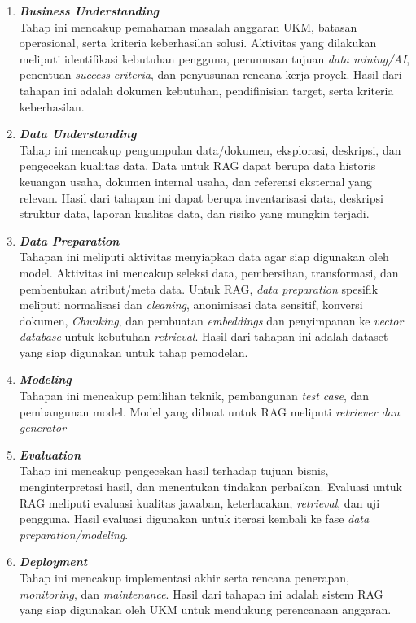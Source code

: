 \begin{enumerate}

\item \textbf{\textit{Business Understanding}}\\
Tahap ini mencakup pemahaman masalah anggaran UKM, batasan operasional, serta kriteria keberhasilan solusi. Aktivitas yang dilakukan meliputi identifikasi kebutuhan pengguna, perumusan tujuan \textit{data mining/AI}, penentuan \textit{success criteria}, dan penyusunan rencana kerja proyek.
Hasil dari tahapan ini adalah dokumen kebutuhan, pendifinisian target, serta kriteria keberhasilan.

\item \textbf{\textit{Data Understanding}}\\
Tahap ini mencakup pengumpulan data/dokumen, eksplorasi, deskripsi, dan pengecekan kualitas data. Data untuk RAG dapat berupa data historis keuangan usaha, dokumen internal usaha, dan referensi eksternal yang relevan. Hasil dari tahapan ini dapat berupa inventarisasi data, deskripsi struktur data, laporan kualitas data, dan risiko yang mungkin terjadi.

\item \textbf{\textit{Data Preparation}}\\
Tahapan ini meliputi aktivitas menyiapkan data agar siap digunakan oleh model. Aktivitas ini mencakup seleksi data, pembersihan, transformasi, dan pembentukan atribut/meta data. Untuk RAG, \textit{data preparation} spesifik meliputi normalisasi dan \textit{cleaning}, anonimisasi data sensitif, konversi dokumen, \textit{Chunking}, dan pembuatan \textit{embeddings} dan penyimpanan ke \textit{vector database} untuk kebutuhan \textit{retrieval}. Hasil dari tahapan ini adalah dataset yang siap digunakan untuk tahap pemodelan.

\item \textbf{\textit{Modeling}}\\
Tahapan ini mencakup pemilihan teknik, pembangunan \textit{test case}, dan pembangunan model. Model yang dibuat untuk RAG meliputi \textit{retriever dan generator}

\item \textbf{\textit{Evaluation}}\\
Tahap ini mencakup pengecekan hasil terhadap tujuan bisnis, menginterpretasi hasil, dan menentukan tindakan perbaikan. Evaluasi untuk RAG meliputi evaluasi kualitas jawaban, keterlacakan, \textit{retrieval}, dan uji pengguna. Hasil evaluasi digunakan untuk iterasi kembali ke fase \textit{data preparation/modeling}.

\item \textbf{\textit{Deployment}}\\
Tahap ini mencakup implementasi akhir serta rencana penerapan, \textit{monitoring}, dan \textit{maintenance}. Hasil dari tahapan ini adalah sistem RAG yang siap digunakan oleh UKM untuk mendukung perencanaan anggaran.

\end{enumerate}
